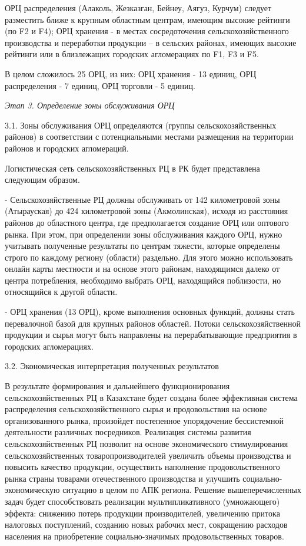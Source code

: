 \begin{multicols}{2}
ОРЦ распределения (Алаколь, Жезказган, Бейнеу, Аягуз, Курчум) следует
разместить ближе к крупным областным центрам, имеющим высокие рейтинги
(по F2 и F4); ОРЦ хранения - в местах сосредоточения
сельскохозяйственного производства и переработки продукции -- в сельских
районах, имеющих высокие рейтинги или в близлежащих городских
агломерациях по F1, F3 и F5.

В целом сложилось 25 ОРЦ, из них: ОРЦ хранения - 13 единиц, ОРЦ
распределения - 7 единиц, ОРЦ торговли - 5 единиц.

\emph{Этап 3. Определение зоны обслуживания ОРЦ}

3.1. Зоны обслуживания ОРЦ определяются (группы сельскохозяйственных
районов) в соответствии с потенциальными местами размещения на
территории районов и городских агломераций.

Логистическая сеть сельскохозяйственных РЦ в РК будет представлена
следующим образом.

- Сельскохозяйственные РЦ должны обслуживать от 142 километровой зоны
(Атырауская) до 424 километровой зоны (Акмолинская), исходя из
расстояния районов до областного центра, где предполагается создание ОРЦ
или оптового рынка. При этом, при определении зоны обслуживания каждого
ОРЦ, нужно учитывать полученные результаты по центрам тяжести, которые
определены строго по каждому региону (области) раздельно. Для этого
можно использовать онлайн карты местности и на основе этого районам,
находящимся далеко от центра потребления, необходимо выбрать ОРЦ,
находящийся поблизости, но относящийся к другой области.

- ОРЦ хранения (13 ОРЦ), кроме выполнения основных функций, должны стать
перевалочной базой для крупных районов областей. Потоки
сельскохозяйственной продукции и сырья могут быть направлены на
перерабатывающие предприятия в городских агломерациях.

3.2. Экономическая интерпретация полученных результатов

В результате формирования и дальнейшего функционирования
сельскохозяйственных РЦ в Казахстане будет создана более эффективная
система распределения сельскохозяйственного сырья и продовольствия на
основе организованного рынка, произойдет постепенное упорядочение
бессистемной деятельности различных посредников. Реализация системы
развития сельскохозяйственных РЦ позволит на основе экономического
стимулирования сельскохозяйственных товаропроизводителей увеличить
объемы производства и повысить качество продукции, осуществить
наполнение продовольственного рынка страны товарами отечественного
производства и улучшить социально-экономическую ситуацию в целом по АПК
региона. Решение вышеперечисленных задач будет способствовать реализации
мультипликативного (умножающего) эффекта: снижению потерь продукции
производителей, увеличению притока налоговых поступлений, созданию новых
рабочих мест, сокращению расходов населения на приобретение
социально-значимых продовольственных товаров.


\end{multicols}
